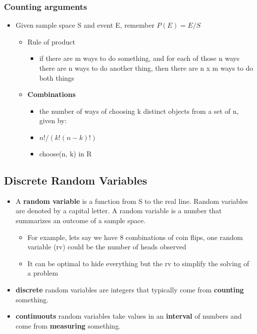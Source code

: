\documentclass[
]{article}
\providecommand{\tightlist}{%
  \setlength{\itemsep}{0pt}\setlength{\parskip}{0pt}}
\begin{document}
\hypertarget{counting-arguments}{%
\subsubsection{Counting arguments}\label{counting-arguments}}

\begin{itemize}
\tightlist
\item
  Given sample space S and event E, remember \(P(E) = E/S\)

  \begin{itemize}
  \tightlist
  \item
    Rule of product

    \begin{itemize}
    \tightlist
    \item
      if there are m ways to do something, and for each of those n ways
      there are n ways to do another thing, then there are n x m ways to
      do both things
    \end{itemize}
  \item
    \textbf{Combinations}

    \begin{itemize}
    \tightlist
    \item
      the number of ways of choosing k distinct objects from a set of n,
      given by:
    \item
      \(n! / (k!(n-k)!)\)
    \item
      choose(n, k) in R
    \end{itemize}
  \end{itemize}
\end{itemize}

\hypertarget{discrete-random-variables}{%
\subsection{Discrete Random Variables}\label{discrete-random-variables}}

\begin{itemize}
\tightlist
\item
  A \textbf{random variable} is a function from S to the real line.
  Random variables are denoted by a capital letter. A random variable is
  a number that summarizes an outcome of a sample space.

  \begin{itemize}
  \tightlist
  \item
    For example, lets say we have 8 combinations of coin flips, one
    random variable (rv) could be the number of heads observed
  \item
    It can be optimal to hide everything but the rv to simplify the
    solving of a problem
  \end{itemize}
\item
  \textbf{discrete} random variables are integers that typically come
  from \textbf{counting} something.
\item
  \textbf{continuouts} random variables take values in an
  \textbf{interval} of numbers and come from \textbf{measuring}
  something.
\end{itemize}
\end{document}
